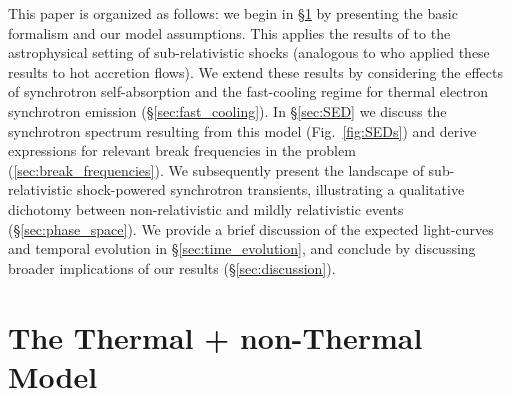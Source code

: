 \documentclass[twocolumn]{aastex63}
\begin{document}
This paper is organized as follows:
we begin in \S\ref{sec:model} by presenting the basic formalism and our model assumptions. This applies the results of \cite{Mahadevan+96} to the astrophysical setting of sub-relativistic shocks (analogous to \citealt{Ozel+00} who applied these results to hot accretion flows). We extend these results by considering the effects of synchrotron self-absorption and the fast-cooling regime for thermal electron synchrotron emission (\S\ref{sec:fast_cooling}). In \S\ref{sec:SED} we discuss the synchrotron spectrum resulting from this model (Fig.~\ref{fig:SEDs}) and derive expressions for relevant break frequencies in the problem (\ref{sec:break_frequencies}).
We subsequently present the landscape of sub-relativistic shock-powered synchrotron transients, illustrating a qualitative dichotomy between non-relativistic and mildly relativistic events (\S\ref{sec:phase_space}). We provide a brief discussion of the expected light-curves and temporal evolution in \S\ref{sec:time_evolution}, and conclude by discussing broader implications of our results (\S\ref{sec:discussion}).


\section{The Thermal + non-Thermal Model}
\label{sec:model}
\end{document}
